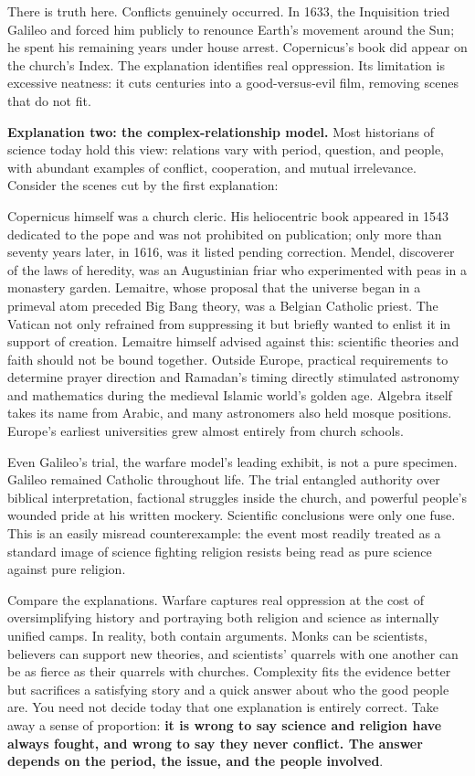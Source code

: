 There is truth here. Conflicts genuinely occurred. In 1633, the Inquisition tried Galileo and forced him publicly to renounce Earth's movement around the Sun; he spent his remaining years under house arrest. Copernicus's book did appear on the church's Index. The explanation identifies real oppression. Its limitation is excessive neatness: it cuts centuries into a good-versus-evil film, removing scenes that do not fit.

\textbf{Explanation two: the complex-relationship model.} Most historians of science today hold this view: relations vary with period, question, and people, with abundant examples of conflict, cooperation, and mutual irrelevance. Consider the scenes cut by the first explanation:

Copernicus himself was a church cleric. His heliocentric book appeared in 1543 dedicated to the pope and was not prohibited on publication; only more than seventy years later, in 1616, was it listed pending correction. Mendel, discoverer of the laws of heredity, was an Augustinian friar who experimented with peas in a monastery garden. Lemaitre, whose proposal that the universe began in a primeval atom preceded Big Bang theory, was a Belgian Catholic priest. The Vatican not only refrained from suppressing it but briefly wanted to enlist it in support of creation. Lemaitre himself advised against this: scientific theories and faith should not be bound together. Outside Europe, practical requirements to determine prayer direction and Ramadan's timing directly stimulated astronomy and mathematics during the medieval Islamic world's golden age. Algebra itself takes its name from Arabic, and many astronomers also held mosque positions. Europe's earliest universities grew almost entirely from church schools.

Even Galileo's trial, the warfare model's leading exhibit, is not a pure specimen. Galileo remained Catholic throughout life. The trial entangled authority over biblical interpretation, factional struggles inside the church, and powerful people's wounded pride at his written mockery. Scientific conclusions were only one fuse. This is an easily misread counterexample: the event most readily treated as a standard image of science fighting religion resists being read as pure science against pure religion.

Compare the explanations. Warfare captures real oppression at the cost of oversimplifying history and portraying both religion and science as internally unified camps. In reality, both contain arguments. Monks can be scientists, believers can support new theories, and scientists' quarrels with one another can be as fierce as their quarrels with churches. Complexity fits the evidence better but sacrifices a satisfying story and a quick answer about who the good people are. You need not decide today that one explanation is entirely correct. Take away a sense of proportion: \textbf{it is wrong to say science and religion have always fought, and wrong to say they never conflict. The answer depends on the period, the issue, and the people involved}.

